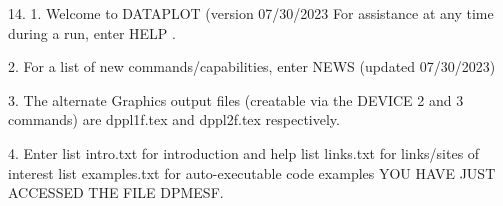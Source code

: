 14.
1. Welcome to DATAPLOT (version 07/30/2023  For assistance at
   any time during a run, enter HELP   .

2. For a list of new commands/capabilities,
   enter NEWS  (updated 07/30/2023)

3. The alternate Graphics output files (creatable
   via the DEVICE 2 and 3 commands) are
   dppl1f.tex and dppl2f.tex respectively.

4. Enter  list intro.txt     for introduction and help
          list links.txt     for links/sites of interest
          list examples.txt  for auto-executable code examples
YOU HAVE JUST ACCESSED THE FILE DPMESF.

